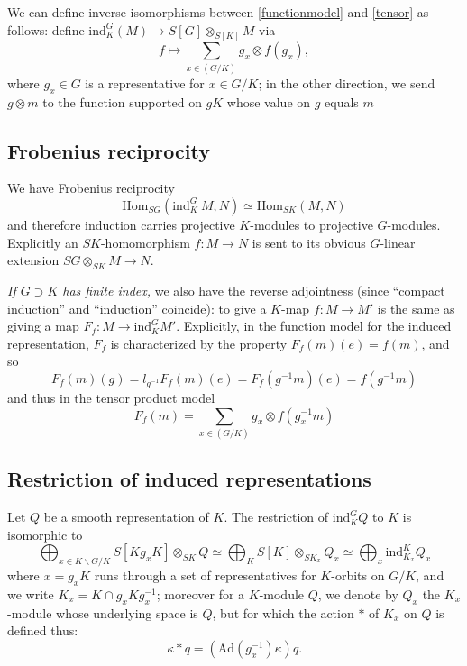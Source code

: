 \documentclass[10pt]{amsart}
\newcommand{\Ad}{\mathrm{Ad}}
\newcommand{\Hom}{\mathrm{Hom}}
\newcommand{\ind}{\mathrm{ind}}
\theoremstyle{remark}
\begin{document}
We can define inverse isomorphisms between  \eqref{functionmodel} and \eqref{tensor} as follows:  
  define $\ind_K^G(M) \rightarrow S[G]\otimes_{S[K]} M$ via 
 $$ f \mapsto \sum_{x \in (G/K)} g_x \otimes f(g_x), $$ 
 where $g_x \in G$ is a representative for $x \in G/K$;
in the other direction, we send $g \otimes m$ to the function supported on $gK$
whose value on $g$ equals $m$  


%
%

\subsection{Frobenius reciprocity} 


We have Frobenius reciprocity  $$\Hom_{SG}(\mathrm{ind}^G_K \ M, N) \simeq \Hom_{SK}(M, N)$$
and therefore induction carries projective $K$-modules to projective $G$-modules. 
Explicitly  an $SK$-homomorphism $f: M \rightarrow N$
is sent to its obvious $G$-linear extension $SG \otimes_{SK} M \rightarrow N$. 



{\em If $G \supset K$ has finite index,} we also have the reverse adjointness (since ``compact induction'' and ``induction'' coincide): 
 to give a $K$-map
$f:  M \rightarrow M'$ is the same as giving a map $F_f: M \rightarrow \ind_{K}^G M'$.
Explicitly, in the function model for the induced representation, $F_f$ is characterized by the property 
$F_f(m)(e) = f(m)$, and so
$$F_f(m)(g) = l_{g^{-1}} F_f(m)(e) = F_f(g^{-1} m)(e) = f(g^{-1} m)$$
and thus in the tensor product model 
\begin{equation} \label{tpmodel} F_f(m) = \sum_{x \in (G/K)} g_x \otimes   f(g_x^{-1} m)\end{equation} 


\subsection{Restriction of induced representations}

Let $Q$ be a smooth representation of $K$. 
The restriction of $\ind^G_K Q$ to $K $ is isomorphic 
to \begin{equation} \label{ind-res} \bigoplus_{x \in  K \backslash G/K}  S[K g_x K] \otimes_{SK} Q \simeq \bigoplus_{K} S[K] \otimes_{S K_x}  Q_x  \simeq \bigoplus_{x} \ind_{K_x}^K Q_x \end{equation}  
where $x = g_x K$ runs through a set of representatives for $K$-orbits on $G/K$, and we write $K_x = K \cap g_x K g_x^{-1}$; moreover
for  a $K$-module $Q$, 
we denote by $Q_x$ the $K_x$-module whose underlying space is $Q$, but 
  for which the action $*$ of $K_x$ on $Q$ is defined thus:
\begin{equation} \label{twist} \kappa * q =  \left( \Ad(g_x^{-1}) \kappa \right)  q.\end{equation}
\end{document}
